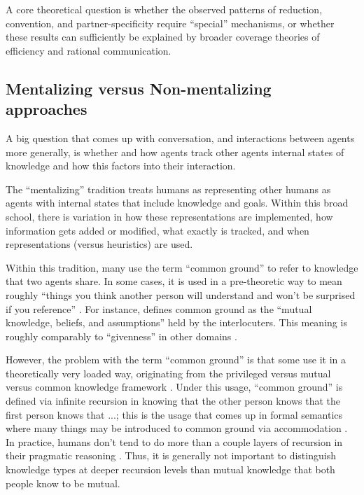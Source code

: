 \documentclass[]{article}
\begin{document}
A core theoretical question is whether the observed patterns of reduction, convention, and partner-specificity require ``special'' mechanisms, or whether these results can sufficiently be explained by broader coverage theories of efficiency and rational communication.
\subsection{Mentalizing versus Non-mentalizing approaches}

A big question that comes up with conversation, and interactions between agents more generally, is whether and how agents track other agents internal states of knowledge and how this factors into their interaction.



The ``mentalizing'' tradition treats humans as representing other humans as agents with internal states that include knowledge and goals.  Within this broad school, there is variation in how these representations are implemented, how information gets added or modified, what exactly is tracked, and when representations (versus heuristics) are used. 

Within this tradition, many use the term ``common ground'' to refer to knowledge that two agents share. In some cases, it is used in a pre-theoretic way to mean roughly ``things you think another person will understand and won't be surprised if you reference'' \citep{leung2023, garrison2022}. For instance,  \citet{hanna2003} defines common ground as the ``mutual knowledge, beliefs, and assumptions'' held by the interlocuters. This meaning is roughly comparably to ``givenness'' in other domains \citep{fay2010}. 

 However, the problem with the term ``common ground'' is that some use it in a theoretically very loaded way, originating from the privileged versus mutual versus common knowledge framework \citep{clark1996}. Under this usage, ``common ground'' is defined via infinite recursion in knowing that the other person knows that the first person knows that ...; this is the usage that comes up in formal semantics where many things may be introduced to common ground via accommodation \citep{horton1996, pickering2004}. In practice, humans don't tend to do more than a couple layers of recursion in their pragmatic reasoning \citep{franke2016}. Thus, it is generally not important to distinguish knowledge types at deeper recursion levels than mutual knowledge that both people know to be mutual. 
\end{document}
